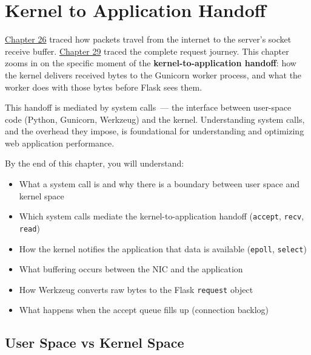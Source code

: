 \setcounter{chapter}{29}
\chapter{Kernel to Application Handoff}\label{ch:30-kernel-application-handoff}

\chapterrule

\hyperref[ch:26-network-stack-flow]{Chapter 26} traced how packets travel from the internet to the server's socket receive buffer. \hyperref[ch:29-client-server-journey]{Chapter 29} traced the complete request journey. This chapter zooms in on the specific moment of the \textbf{kernel-to-application handoff}: how the kernel delivers received bytes to the Gunicorn worker process, and what the worker does with those bytes before Flask sees them.

This handoff is mediated by system calls~--- the interface between user-space code (Python, Gunicorn, Werkzeug) and the kernel. Understanding system calls, and the overhead they impose, is foundational for understanding and optimizing web application performance.

\begin{objectives}

By the end of this chapter, you will understand:

\begin{itemize}
\tightlist
\item
  What a system call is and why there is a boundary between user space and kernel space
\item
  Which system calls mediate the kernel-to-application handoff (\texttt{accept}, \texttt{recv}, \texttt{read})
\item
  How the kernel notifies the application that data is available (\texttt{epoll}, \texttt{select})
\item
  What buffering occurs between the NIC and the application
\item
  How Werkzeug converts raw bytes to the Flask \texttt{request} object
\item
  What happens when the accept queue fills up (connection backlog)
\end{itemize}

\end{objectives}

\setcounter{section}{0}
\section{User Space vs Kernel Space}\label{30-kernel-application-handoff:301-user-space-vs-kernel-space}

